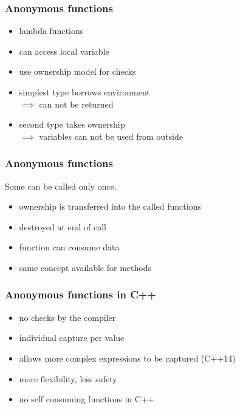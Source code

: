 \documentclass[xcolor=colortbl
]{beamer}
\begin{document}
\begin{frame}
    \frametitle{Anonymous functions}
    \hfill \hyperlink{skippedLambda}{}
    
    \begin{itemize}
        \item lambda functions
        \item can access local variable
        \item use ownership model for checks
        \item simplest type borrows environment
        \\ $\implies$ can not be returned
        \item second type takes ownership
        \\ $\implies$ variables can not be used from outside
    \end{itemize}
\end{frame}

\begin{frame}
    \frametitle{Anonymous functions}
    Some can be called only once.
    
    \begin{itemize}
        \item ownership is transferred into the called functions
        \item destroyed at end of call
        \item function can consume data
        \item same concept available for methods
    \end{itemize}
\end{frame}


\begin{frame}
    \frametitle{Anonymous functions in C++}    
    \begin{itemize}
        \item no checks by the compiler
        \item individual capture per value
        \item allows more complex expressions to be captured (C++14)
        \item more flexibility, less safety
        \item no self consuming functions in C++
    \end{itemize}
\end{frame}
\end{document}
